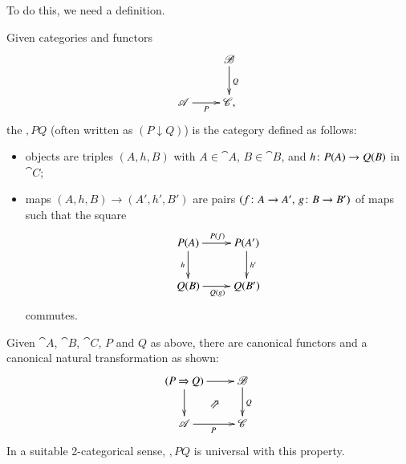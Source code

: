 To do this, we need a definition.

\begin{defn}
Given categories and functors
\[
\xymatrix{
        &\cat{B} \ar[d]^Q       \\
\cat{A} \ar[r]_P        &
\cat{C},
}
\]
the  $\comma{P}{Q}$%
%
%
(often written as $(P \mathbin{\downarrow} Q)$) is the category defined as
follows:
%
\begin{itemize}
\item
objects are triples $(A, h, B)$ with $A \in \cat{A}$, $B \in \cat{B}$, and
$h\from P(A) \to Q(B)$ in $\cat{C}$;

\item
maps $(A, h, B) \to (A', h', B')$ are pairs $(f\from A \to A',\, g\from B
\to B')$ of maps such that the square
\[
\xymatrix{
P(A)    \ar[r]^{P(f)} \ar[d]_h  &
P(A')   \ar[d]^{h'}     \\
Q(B) \ar[r]_{Q(g)}      &
Q(B')
}
\]
commutes.
\end{itemize}
\end{defn}

\begin{remark}
Given $\cat{A}$, $\cat{B}$, $\cat{C}$, $P$ and $Q$ as above, there
are canonical functors and a canonical natural transformation as shown:
\[
\xymatrix{
\comma{P}{Q} \ar[r] \ar[d] \ar@{}[dr]|-{\nent}  &
\cat{B} \ar[d]^Q        \\
\cat{A} \ar[r]_P        &
\cat{C}
}
\]
In a suitable 2-categorical sense, $\comma{P}{Q}$ is universal with this
property.
\end{remark}

